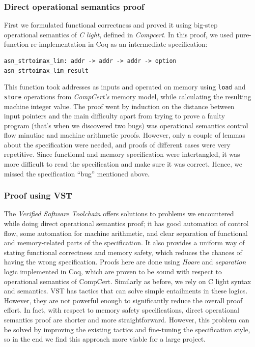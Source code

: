 \documentclass[acmsmall,nonacm]{acmart}
\begin{document}
\subsubsection{Direct operational semantics proof}

First we formulated functional correctness and proved it using
big-step operational semantics of \textit{C light}, defined in
\textit{Compcert}. In this proof, we used pure-function
re-implementation in Coq as an intermediate specification:

\begin{lstlisting}[language=Coq]
asn_strtoimax_lim: addr -> addr -> addr -> option asn_strtoimax_lim_result
\end{lstlisting}

This function took addresses as inputs and operated on memory using
\texttt{load} and \texttt{store} operations from \textit{CompCert's}
memory model, while calculating the resulting machine integer
value. The proof went by induction on the distance between input
pointers and the main difficulty apart from trying to prove a faulty
program (that's when we discovered two bugs) was operational semantics
control flow minutiae and machine arithmetic proofs. However, only a
couple of lemmas about the specification were needed, and proofs of
different cases were very repetitive. Since functional and memory
specification were intertangled, it was more difficult to read the
specification and make sure it was correct. Hence, we missed the
specification ``bug'' mentioned above.

\subsubsection{Proof using VST}

The \textit{Verified Software Toolchain} \cite{VST} offers solutions
to problems we encountered while doing direct operational semantics
proof; it has good automation of control flow, some automation for
machine arithmetic, and clear separation of functional and
memory-related parts of the specification. It also provides a uniform
way of stating functional correctness and memory safety, which reduces
the chances of having the wrong specification. Proofs here are done
using \textit{Hoare} and \textit{separation} logic implemented in Coq,
which are proven to be sound with respect to operational semantics of
CompCert. Similarly as before, we rely on C light syntax and
semantics. VST has tactics that can solve simple entailments in these
logics. However, they are not powerful enough to significantly reduce
the overall proof effort. In fact, with respect to memory safety
specifications, direct operational semantics proof are shorter and
more straightforward. However, this problem can be solved by improving
the existing tactics and fine-tuning the specification style, so in
the end we find this approach more viable for a large project.
\end{document}
